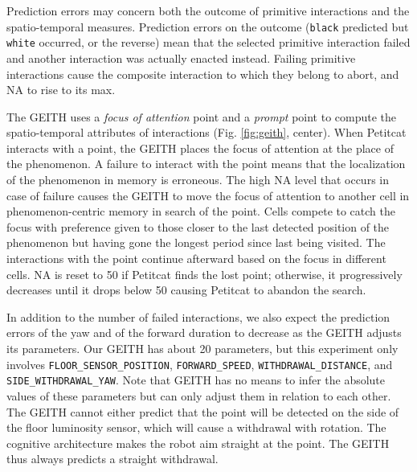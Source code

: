 \documentclass[runningheads]{llncs}
\begin{document}
Prediction errors may concern both the outcome of primitive interactions and the spatio-temporal measures.
Prediction errors on the outcome (\texttt{black} predicted but \texttt{white} occurred, or the reverse) mean that the selected primitive interaction failed and another interaction was actually enacted instead. 
Failing primitive interactions cause the composite interaction to which they belong to abort, and NA to rise to its max.

The GEITH uses a \textit{focus of attention} point and a \textit{prompt} point to compute the spatio-temporal attributes of interactions (Fig. \ref{fig:geith}, center). 
When Petitcat interacts with a point, the GEITH places the focus of attention at the place of the phenomenon. 
A failure to interact with the point means that the localization of the phenomenon in memory is erroneous. 
The high NA level that occurs in case of failure causes the GEITH to move the focus of attention to another cell in phenomenon-centric memory in search of the point.
Cells compete to catch the focus with preference given to those closer to the last detected position of the phenomenon but having gone the longest period since last being visited.
The interactions with the point continue afterward based on the focus in different cells. 
NA is reset to 50 if Petitcat finds the lost point; otherwise, it progressively decreases until it drops below 50 causing Petitcat to abandon the search. 

In addition to the number of failed interactions, we also expect the prediction errors of the yaw and of the forward duration to decrease as the GEITH adjusts its parameters. 
Our GEITH has about 20 parameters, but this experiment only involves \texttt{FLOOR\_SENSOR\_POSITION}, \texttt{FORWARD\_SPEED}, \texttt{WITHDRAWAL\_DIS\-TANCE}, and \texttt{SIDE\_WITH\-DRA\-WAL\_YAW}.
Note that GEITH has no means to infer the absolute values of these parameters but can only adjust them in relation to each other.
The GEITH cannot either predict that the point will be detected on the side of the floor luminosity sensor, which will cause a withdrawal with rotation. 
The cognitive architecture makes the robot aim straight at the point.
The GEITH thus always predicts a straight withdrawal. 

\end{document}
